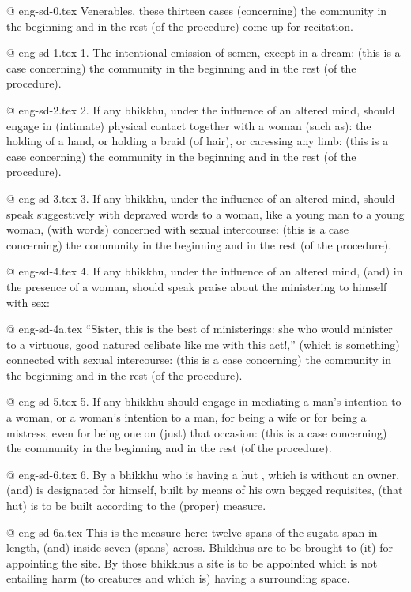 @ eng-sd-0.tex
Venerables, these thirteen cases (concerning) the community in the beginning and in the rest (of the procedure) come up for recitation.

@ eng-sd-1.tex
1. The intentional emission of semen, except in a dream: (this is a case concerning) the community in the beginning and in the rest (of the procedure).

@ eng-sd-2.tex
2. If any bhikkhu, under the influence of an altered mind, should engage in (intimate) physical contact together with a woman (such as): the holding of a hand, or holding a braid (of hair), or caressing any limb: (this is a case concerning) the community in the beginning and in the rest (of the procedure).

@ eng-sd-3.tex
3. If any bhikkhu, under the influence of an altered mind, should speak suggestively with depraved words to a woman, like a young man to a young woman, (with words) concerned with sexual intercourse: (this is a case concerning) the community in the beginning and in the rest (of the procedure).

@ eng-sd-4.tex
4. If any bhikkhu, under the influence of an altered mind, (and) in the presence of a woman, should speak praise about the ministering to himself with sex:

@ eng-sd-4a.tex
“Sister, this is the best of ministerings: she who would minister to a virtuous, good natured celibate like me with this act!,” (which is something) connected with sexual intercourse: (this is a case concerning) the community in the beginning and in the rest (of the procedure).

@ eng-sd-5.tex
5. If any bhikkhu should engage in mediating a man's intention to a woman, or a woman's intention to a man, for being a wife or for being a mistress, even for being one on (just) that occasion: (this is a case concerning) the community in the beginning and in the rest (of the procedure).

@ eng-sd-6.tex
6. By a bhikkhu who is having a hut , which is without an owner, (and) is designated for himself, built by means of his own begged requisites, (that hut) is to be built according to the (proper) measure. 

@ eng-sd-6a.tex
This is the measure here: twelve spans of the sugata-span in length, (and) inside seven (spans) across. Bhikkhus are to be brought to (it) for appointing the site. By those bhikkhus a site is to be appointed which is not entailing harm (to creatures and which is) having a surrounding space.

